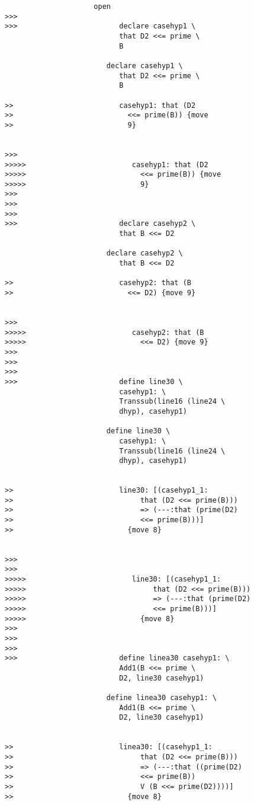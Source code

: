 \documentclass[12pt]{article}
\begin{document}
\begin{verbatim}
                     open
>>>
>>>                        declare casehyp1 \
                           that D2 <<= prime \
                           B

                        declare casehyp1 \
                           that D2 <<= prime \
                           B

>>                         casehyp1: that (D2
>>                           <<= prime(B)) {move
>>                           9}


>>>
>>>>>                         casehyp1: that (D2
>>>>>                           <<= prime(B)) {move
>>>>>                           9}
>>>
>>>
>>>
>>>                        declare casehyp2 \
                           that B <<= D2

                        declare casehyp2 \
                           that B <<= D2

>>                         casehyp2: that (B
>>                           <<= D2) {move 9}


>>>
>>>>>                         casehyp2: that (B
>>>>>                           <<= D2) {move 9}
>>>
>>>
>>>
>>>                        define line30 \
                           casehyp1: \
                           Transsub(line16 (line24 \
                           dhyp), casehyp1)

                        define line30 \
                           casehyp1: \
                           Transsub(line16 (line24 \
                           dhyp), casehyp1)


>>                         line30: [(casehyp1_1:
>>                              that (D2 <<= prime(B)))
>>                              => (---:that (prime(D2)
>>                              <<= prime(B)))]
>>                           {move 8}


>>>
>>>
>>>>>                         line30: [(casehyp1_1:
>>>>>                              that (D2 <<= prime(B)))
>>>>>                              => (---:that (prime(D2)
>>>>>                              <<= prime(B)))]
>>>>>                           {move 8}
>>>
>>>
>>>
>>>                        define linea30 casehyp1: \
                           Add1(B <<= prime \
                           D2, line30 casehyp1)

                        define linea30 casehyp1: \
                           Add1(B <<= prime \
                           D2, line30 casehyp1)


>>                         linea30: [(casehyp1_1:
>>                              that (D2 <<= prime(B)))
>>                              => (---:that ((prime(D2)
>>                              <<= prime(B))
>>                              V (B <<= prime(D2))))]
>>                           {move 8}



\end{verbatim}
\end{document}
